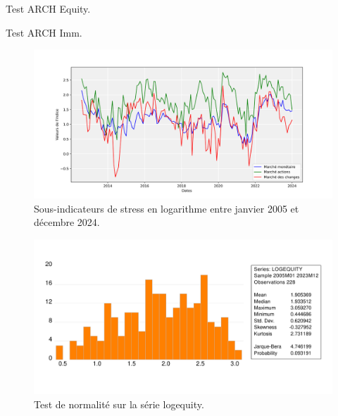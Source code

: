 \begin{table}[H]
    \centering
    \caption{Test ARCH Equity.}
    \sffamily
    
    \label{tab:arch_test_equity}
\end{table}

\begin{table}[H]
    \centering
    \caption{Test ARCH Imm.}
    \sffamily
    
    \label{tab:arch_test_imm}
\end{table}

\begin{figure}[H]
    \centering
    \includegraphics[width=1\linewidth]{annexes/sous_indicateurs_stress_log.png}
    \caption{Sous-indicateurs de stress en logarithme entre janvier 2005 et décembre 2024.}
    \label{fig:graphindicateurslog}
\end{figure}

\begin{figure}[H]
    \centering
    \includegraphics[width=1\linewidth]{annexes/jb_logequity.pdf}
    \caption{Test de normalité sur la série logequity.}
    \label{fig:normalitelogequity}
\end{figure}


